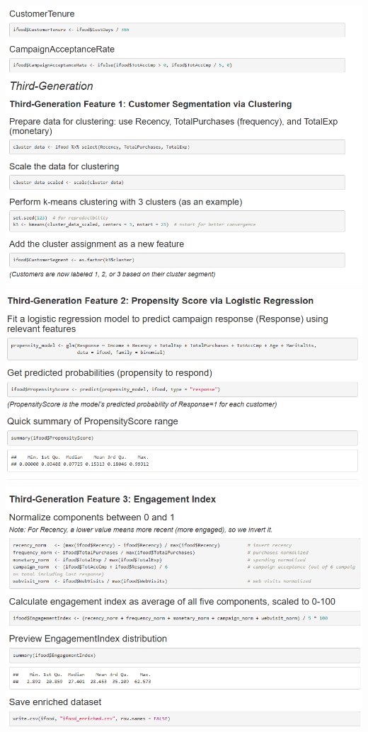 \documentclass[12pt,a4paper]{article}
\begin{document}
\includegraphics[width=\textwidth]{Imatges/pre5.png}
\centering
\includegraphics[width=\textwidth]{Imatges/pre6.png}
\centering
\includegraphics[width=\textwidth]{Imatges/pre7.png}
\end{document}
